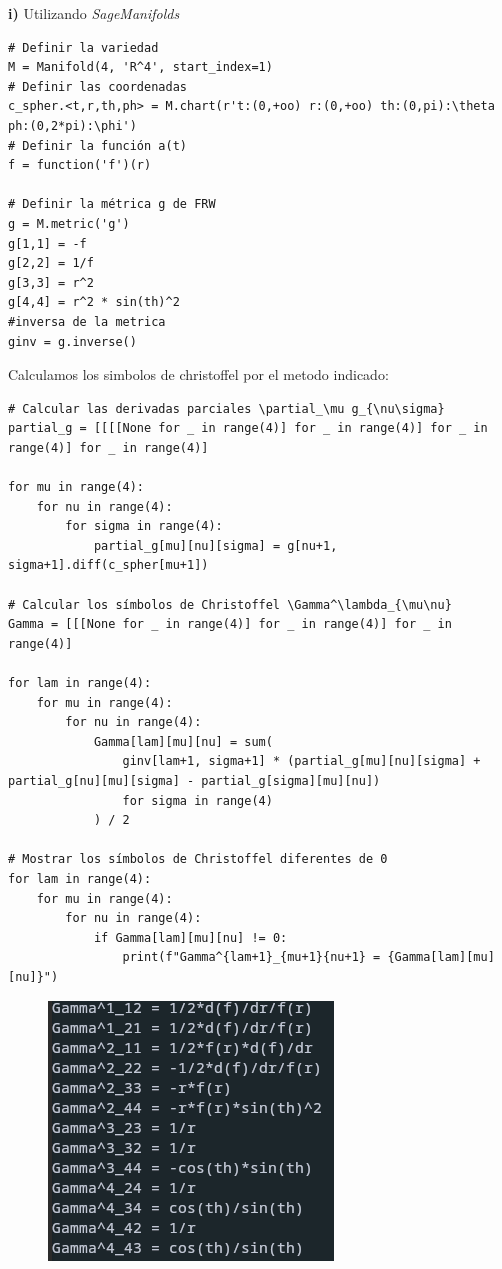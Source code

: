 \documentclass{article}
\begin{document}
\textbf{i)} Utilizando \textit{SageManifolds}
\begin{verbatim}
# Definir la variedad
M = Manifold(4, 'R^4', start_index=1)
# Definir las coordenadas
c_spher.<t,r,th,ph> = M.chart(r't:(0,+oo) r:(0,+oo) th:(0,pi):\theta ph:(0,2*pi):\phi')
# Definir la función a(t)
f = function('f')(r)

# Definir la métrica g de FRW
g = M.metric('g')
g[1,1] = -f
g[2,2] = 1/f
g[3,3] = r^2
g[4,4] = r^2 * sin(th)^2
#inversa de la metrica 
ginv = g.inverse()
\end{verbatim}
Calculamos los simbolos de christoffel por el metodo indicado: 
\begin{verbatim}
# Calcular las derivadas parciales \partial_\mu g_{\nu\sigma}
partial_g = [[[[None for _ in range(4)] for _ in range(4)] for _ in range(4)] for _ in range(4)]

for mu in range(4):
    for nu in range(4):
        for sigma in range(4):
            partial_g[mu][nu][sigma] = g[nu+1, sigma+1].diff(c_spher[mu+1])

# Calcular los símbolos de Christoffel \Gamma^\lambda_{\mu\nu}
Gamma = [[[None for _ in range(4)] for _ in range(4)] for _ in range(4)]

for lam in range(4):
    for mu in range(4):
        for nu in range(4):
            Gamma[lam][mu][nu] = sum(
                ginv[lam+1, sigma+1] * (partial_g[mu][nu][sigma] + partial_g[nu][mu][sigma] - partial_g[sigma][mu][nu])
                for sigma in range(4)
            ) / 2

# Mostrar los símbolos de Christoffel diferentes de 0
for lam in range(4):
    for mu in range(4):
        for nu in range(4):
            if Gamma[lam][mu][nu] != 0:
                print(f"Gamma^{lam+1}_{mu+1}{nu+1} = {Gamma[lam][mu][nu]}")
\end{verbatim}
\begin{figure}[H]
    \centering
    \includegraphics[width=0.35\linewidth]{output_chris.png}
\end{figure}

\hfill 
\end{document}
